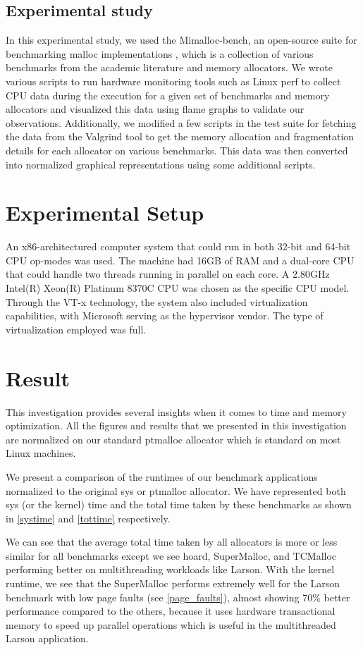 \documentclass[sigplan,screen]{acmart}
\begin{document}
\subsection{Experimental study}

In this experimental study, we used the Mimalloc-bench, an open-source suite for benchmarking malloc implementations \cite{mimallocGit}, which is a collection of various benchmarks from the academic literature and memory allocators. We wrote various scripts to run hardware monitoring tools such as Linux perf to collect CPU data during the execution for a given set of benchmarks and memory allocators and visualized this data using flame graphs to validate our observations. Additionally, we modified a few scripts in the test suite for fetching the data from the Valgrind tool to get the memory allocation and fragmentation details for each allocator on various benchmarks. This data was then converted into normalized graphical representations using some additional scripts.

\section{Experimental Setup}
An x86-architectured computer system that could run in both 32-bit and 64-bit CPU op-modes was used. The machine had 16GB of RAM and a dual-core CPU that could handle two threads running in parallel on each core. A 2.80GHz Intel(R) Xeon(R) Platinum 8370C CPU was chosen as the specific CPU model. Through the VT-x technology, the system also included virtualization capabilities, with Microsoft serving as the hypervisor vendor. The type of virtualization employed was full.

\section{Result}
This investigation provides several insights when it comes to time and memory optimization. All the figures and results that we presented in this investigation are normalized on our standard ptmalloc allocator which is standard on most Linux machines.

We present a comparison of the runtimes of our benchmark applications normalized to the original sys or ptmalloc allocator. We have represented both sys (or the kernel) time and the total time taken by these benchmarks as shown in \figurename{ \ref{systime}} and \figurename{ \ref{tottime}} respectively. 

We can see that the average total time taken by all allocators is more or less similar for all benchmarks except we see hoard, SuperMalloc, and TCMalloc performing better on multithreading workloads like Larson. With the kernel runtime, we see that the SuperMalloc performs extremely well for the Larson benchmark with low page faults (see \figurename{ \ref{page_faults}}), almost showing 70\% better performance compared to the others, because it uses hardware transactional memory to speed up parallel operations which is useful in the multithreaded Larson application.
\end{document}
